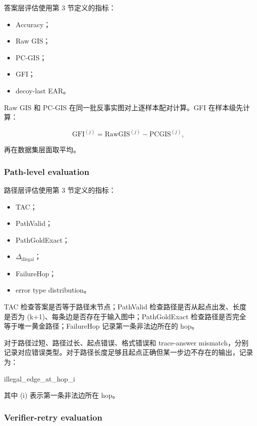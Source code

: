 \documentclass[
  11pt,
]{article}
\newenvironment{Shaded}{}{}
\newcommand{\NormalTok}[1]{#1}
\begin{document}
答案层评估使用第 3 节定义的指标：

\begin{itemize}
\item
  Accuracy；
\item
  Raw GIS；
\item
  PC-GIS；
\item
  GFI；
\item
  decoy-last EAR。
\end{itemize}

Raw GIS 和 PC-GIS 在同一批反事实图对上逐样本配对计算。GFI
在样本级先计算：

\[
\mathrm{GFI}^{(j)}=\mathrm{RawGIS}^{(j)}-\mathrm{PCGIS}^{(j)},  
\]

再在数据集层面取平均。

\subsubsection{Path-level evaluation}\label{path-level-evaluation}

路径层评估使用第 3 节定义的指标：

\begin{itemize}
\item
  TAC；
\item
  PathValid；
\item
  PathGoldExact；
\item
  \(\Delta_{\text{illegal}}\)；
\item
  FailureHop；
\item
  error type distribution。
\end{itemize}

TAC 检查答案是否等于路径末节点；PathValid
检查路径是否从起点出发、长度是否为
(k+1)、每条边是否存在于输入图中；PathGoldExact
检查路径是否完全等于唯一黄金路径；FailureHop 记录第一条非法边所在的
hop。

对于路径过短、路径过长、起点错误、格式错误和 trace-answer
mismatch，分别记录对应错误类型。对于路径长度足够且起点正确但某一步边不存在的输出，记录为：

\begin{Shaded}
\begin{Highlighting}[]
\NormalTok{illegal\_edge\_at\_hop\_i}
\end{Highlighting}
\end{Shaded}

其中 (i) 表示第一条非法边所在 hop。

\subsubsection{Verifier-retry
evaluation}\label{verifier-retry-evaluation}
\end{document}
